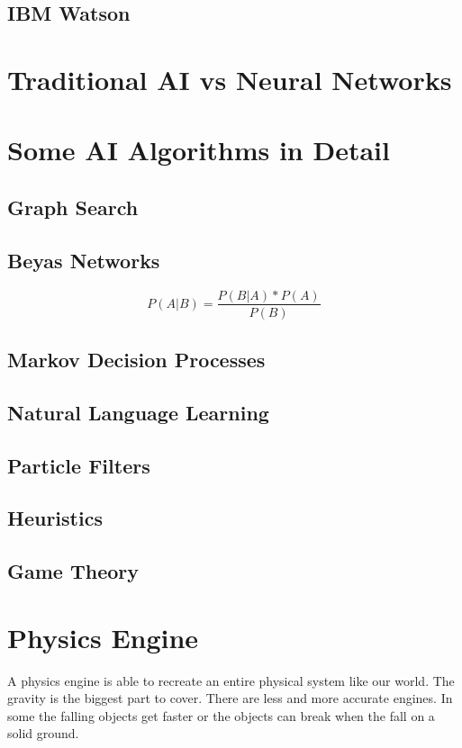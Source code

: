 \documentclass[DIV=calc, paper=a4, fontsize=11pt, twocolumn]{scrartcl}	 %
\begin{document}
\subsection*{IBM Watson}

\section*{Traditional AI vs Neural Networks}

\section*{Some AI Algorithms in Detail}
\subsection*{Graph Search}
\subsection*{Beyas Networks}

\[P(A|B)=\frac{P(B|A) * P(A)}{P(B)}\]

\subsection*{Markov Decision Processes}
\subsection*{Natural Language Learning}
\subsection*{Particle Filters}
\subsection*{Heuristics}
\subsection*{Game Theory}


\section*{Physics Engine}
A physics engine is able to recreate an entire physical system like our world. The gravity is the biggest part to cover. There are less and more accurate engines. In some the falling objects get faster or the objects can break when the fall on a solid ground.
\end{document}
